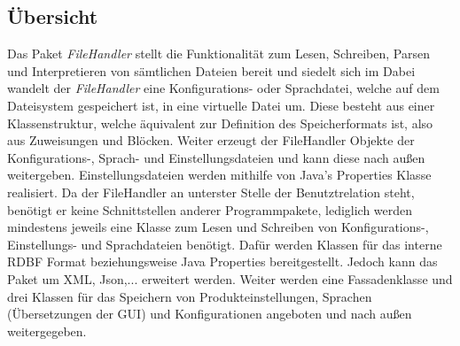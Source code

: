 \documentclass[parskip=full]{scrartcl}
\begin{document}
\subsection{Übersicht}
Das Paket \textit{FileHandler} stellt die Funktionalität zum Lesen, Schreiben, Parsen und Interpretieren von sämtlichen Dateien bereit und siedelt sich im %
Dabei wandelt der \textit{FileHandler} eine Konfigurations- oder Sprachdatei, welche auf dem Dateisystem gespeichert ist, in eine virtuelle Datei um.
Diese besteht aus einer Klassenstruktur, welche äquivalent zur Definition des Speicherformats ist, also aus Zuweisungen und Blöcken.
Weiter erzeugt der FileHandler Objekte der Konfigurations-, Sprach- und Einstellungsdateien und kann diese nach außen weitergeben.
Einstellungsdateien werden mithilfe von Java's Properties Klasse realisiert.
Da der FileHandler an unterster Stelle der Benutztrelation steht, benötigt er keine Schnittstellen anderer Programmpakete, lediglich werden mindestens jeweils eine Klasse zum Lesen und Schreiben von Konfigurations-, Einstellungs- und Sprachdateien benötigt.
Dafür werden Klassen für das interne RDBF Format beziehungsweise Java Properties bereitgestellt. Jedoch kann das Paket um XML, Json,... erweitert werden.
Weiter werden eine Fassadenklasse und drei Klassen für das Speichern von Produkteinstellungen, Sprachen (Übersetzungen der GUI) und Konfigurationen angeboten und nach außen weitergegeben.
\newpage
\end{document}
